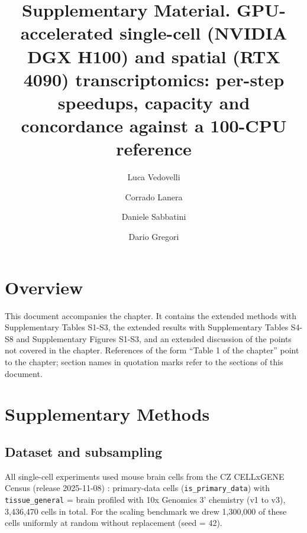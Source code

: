 \documentclass[runningheads]{llncs}
\begin{document}
\title{Supplementary Material. GPU-accelerated single-cell (NVIDIA DGX H100) and spatial (RTX 4090) transcriptomics: per-step speedups, capacity and concordance against a 100-CPU reference}
\author{Luca Vedovelli \and Corrado Lanera \and Daniele Sabbatini \and Dario Gregori}
\maketitle

\hypertarget{overview}{%
\section{Overview}\label{overview}}

This document accompanies the chapter. It contains the extended methods with Supplementary Tables S1-S3, the extended results with Supplementary Tables S4-S8 and Supplementary Figures S1-S3, and an extended discussion of the points not covered in the chapter. References of the form ``Table 1 of the chapter'' point to the chapter; section names in quotation marks refer to the sections of this document.

\hypertarget{supplementary-methods}{%
\section{Supplementary Methods}\label{supplementary-methods}}

\hypertarget{dataset-and-subsampling}{%
\subsection{Dataset and subsampling}\label{dataset-and-subsampling}}

All single-cell experiments used mouse brain cells from the CZ CELLxGENE Census (release 2025-11-08) \cite{CZCellxGene2025}: primary-data cells (\texttt{is\_\allowbreak{}primary\_\allowbreak{}data}) with \texttt{tissue\_\allowbreak{}general} = brain profiled with 10x Genomics 3' chemistry (v1 to v3), 3,436,470 cells in total. For the scaling benchmark we drew 1,300,000 of these cells uniformly at random without replacement (seed = 42).
\end{document}
